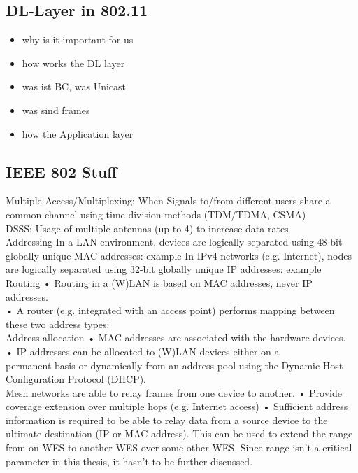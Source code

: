 \documentclass[]{ccs-thesis}
\begin{document}
\subsection{DL-Layer in 802.11}

\begin{itemize}
	\item why is it important for us
	\item how works the DL layer
	\item was ist BC, was Unicast
	\item was sind frames
	\item how the Application layer
\end{itemize}

\subsection{IEEE 802 Stuff}
Multiple Access/Multiplexing: When Signals to/from different users share a common channel using time division methods (TDM/TDMA, CSMA)\\

DSSS: Usage of multiple antennas
(up to 4) to increase data rates\\

Addressing
In a LAN environment, devices are logically separated using 48-bit
globally unique MAC addresses: example
In IPv4 networks (e.g. Internet), nodes are logically separated
using 32-bit globally unique IP addresses: example \\

Routing
• Routing in a (W)LAN is based on MAC addresses, never IP addresses.\\
• A router (e.g. integrated with an access point) performs mapping between\\
these two address types: \\

Address allocation
• MAC addresses are associated with the hardware devices.\\
• IP addresses can be allocated to (W)LAN devices either on a\\
permanent basis or dynamically from an address pool using the
Dynamic Host Configuration Protocol (DHCP). \\

Mesh networks
are able to relay frames from one device to another.
• Provide coverage extension over multiple hops (e.g. Internet access)
• Sufficient address information is required to be able to relay data from a
source device to the ultimate destination (IP or MAC address).
This can be used to extend the range from on \ac{WES} to another \ac{WES} over some other \ac{WES}.
Since range isn't a critical parameter in this thesis, it hasn't to be further discussed.\\
\end{document}
